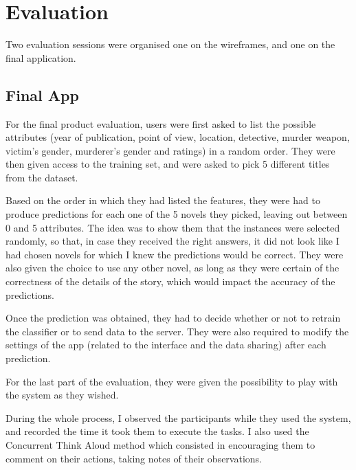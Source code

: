 \documentclass{mproj}
\begin{document}
\chapter{Evaluation}\label{evaluation}

Two evaluation sessions were organised one on the wireframes, and one on the final application. 



\section{Final App}

For the final product evaluation, users were first asked to list the possible attributes (year of publication, point of view, location, detective, murder weapon, victim's gender, murderer's gender and ratings) in a random order. They were then given access to the training set, and were asked to pick 5 different titles from the dataset. \par

Based on the order in which they had listed the features, they were had to produce predictions for each one of the 5 novels they picked, leaving out between 0 and 5 attributes. The idea was to show them that the instances were selected randomly, so that, in case they received the right answers, it did not look like I had chosen novels for which I knew the predictions would be correct. They were also given the choice to use any other novel, as long as they were certain of the correctness of the details of the story, which would impact the accuracy of the predictions. \par 

Once the prediction was obtained, they had to decide whether or not to retrain the classifier or to send data to the server. They were also required to modify the settings of the app (related to the interface and the data sharing) after each prediction. \par

For the last part of the evaluation, they were given the possibility to play with the system as they wished.\par

During the whole process, I observed the participants while they used the system, and recorded the time it took them to execute the tasks. I also used the Concurrent Think Aloud method \cite{usabilitytest} which consisted in encouraging them to comment on their actions, taking notes of their observations.
\end{document}

